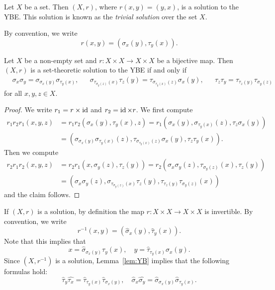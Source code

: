 \begin{example}
Let $X$ be a set. Then $(X,r)$, where $r(x,y)=(y,x)$, is a solution to the YBE. This solution 
is known as the \emph{trivial solution} over the set $X$. 
\end{example}

By convention, we write
\[
r(x,y)=(\sigma_x(y),\tau_y(x)).
\]

\begin{lemma}
    \label{lem:YB}
    Let $X$ be a non-empty set and $r\colon X\times X\to X\times X$ be a bijective map.
    Then $(X,r)$ is a set-theoretic solution to the YBE if and only if 
    \begin{align*}
        &\sigma_x\sigma_y = \sigma_{\sigma_x(y)}\sigma_{\tau_y(x)},&
        &\sigma_{\tau_{\sigma_y(z)}(x)}\tau_z(y)=\tau_{\sigma_{\tau_y(x)}(z)}\sigma_x(y),&
        &\tau_z\tau_y=\tau_{\tau_z(y)}\tau_{\sigma_y(z)}
    \end{align*}
    for all $x,y,z\in X$. 
\end{lemma}

\begin{proof}
    We write $r_1=r\times\operatorname{id}$ and $r_2=\operatorname{id}\times r$. We first compute
    \begin{align*}
        r_1r_2r_1(x,y,z)&=r_1r_2(\sigma_x(y),\tau_y(x),z)
        =r_1(\sigma_x(y),\sigma_{\tau_y(x)}(z),\tau_z\sigma_x(y))\\
        &=\left(\sigma_{\sigma_x(y)}\sigma_{\tau_y(x)}(z),\tau_{\sigma_{\tau_y(x)}(z)}\sigma_x(y),\tau_z\tau_y(x)\right).
    \end{align*}
    Then we compute
    \begin{align*}
        r_2r_1r_2(x,y,z)&=r_2r_1(x,\sigma_y(z),\tau_z(y))
        =r_2(\sigma_x\sigma_y(z),\tau_{\sigma_y(z)}(x),\tau_z(y))\\
        &=\left(\sigma_x\sigma_y(z),\sigma_{\tau_{\sigma_y(z)}(x)}\tau_z(y),\tau_{\tau_z(y)}\tau_{\sigma_y(z)}(x)\right)
    \end{align*}
    and the claim follows.    
\end{proof}

If $(X,r)$ is a solution, by definition the map $r\colon X\times X\to X\times X$ is 
invertible. By convention, we write 
 \[
 r^{-1}(x,y)=(\widehat{\sigma}_x(y),\widehat{\tau}_y(x)).
 \]
 Note that this implies that
 \[
 x=\widehat{\sigma}_{\sigma_x(y)}\tau_y(x),\quad
 y=\widehat{\tau}_{\tau_y(x)}\sigma_x(y).
 \]
 Since $(X,r^{-1})$ is a solution, Lemma~\ref{lem:YB} implies that 
 the following formulas hold:
 \[
 \widehat{\tau}_y\widehat{\tau_x}=\widehat{\tau}_{\tau_y(x)}\widehat{\tau}_{\sigma_x(y)},
 \quad
 \widehat{\sigma}_x\widehat{\sigma_y}=\widehat{\sigma}_{\sigma_x(y)}\widehat{\sigma}_{\tau_y(x)}.
 \]

